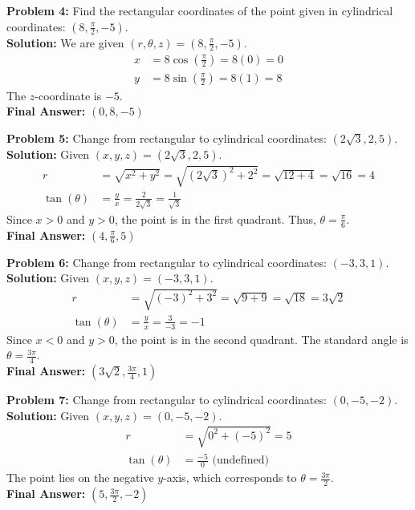 \documentclass[12pt]{article}
\begin{document}
\textbf{Problem 4:} Find the rectangular coordinates of the point given in cylindrical coordinates: $(8, \frac{\pi}{2}, -5)$.
\\
\textbf{Solution:} We are given $(r, \theta, z) = (8, \frac{\pi}{2}, -5)$.
\begin{align*}
x &= 8 \cos\left(\frac{\pi}{2}\right) = 8(0) = 0 \\
y &= 8 \sin\left(\frac{\pi}{2}\right) = 8(1) = 8
\end{align*}
The $z$-coordinate is $-5$.
\\
\textbf{Final Answer:} $(0, 8, -5)$
\vspace{0.5cm}

\textbf{Problem 5:} Change from rectangular to cylindrical coordinates: $(2\sqrt{3}, 2, 5)$.
\\
\textbf{Solution:} Given $(x, y, z) = (2\sqrt{3}, 2, 5)$.
\begin{align*}
r &= \sqrt{x^2 + y^2} = \sqrt{(2\sqrt{3})^2 + 2^2} = \sqrt{12 + 4} = \sqrt{16} = 4 \\
\tan(\theta) &= \frac{y}{x} = \frac{2}{2\sqrt{3}} = \frac{1}{\sqrt{3}}
\end{align*}
Since $x > 0$ and $y > 0$, the point is in the first quadrant. Thus, $\theta = \frac{\pi}{6}$.
\\
\textbf{Final Answer:} $(4, \frac{\pi}{6}, 5)$
\vspace{0.5cm}

\textbf{Problem 6:} Change from rectangular to cylindrical coordinates: $(-3, 3, 1)$.
\\
\textbf{Solution:} Given $(x, y, z) = (-3, 3, 1)$.
\begin{align*}
r &= \sqrt{(-3)^2 + 3^2} = \sqrt{9 + 9} = \sqrt{18} = 3\sqrt{2} \\
\tan(\theta) &= \frac{y}{x} = \frac{3}{-3} = -1
\end{align*}
Since $x < 0$ and $y > 0$, the point is in the second quadrant. The standard angle is $\theta = \frac{3\pi}{4}$.
\\
\textbf{Final Answer:} $(3\sqrt{2}, \frac{3\pi}{4}, 1)$
\vspace{0.5cm}

\textbf{Problem 7:} Change from rectangular to cylindrical coordinates: $(0, -5, -2)$.
\\
\textbf{Solution:} Given $(x, y, z) = (0, -5, -2)$.
\begin{align*}
r &= \sqrt{0^2 + (-5)^2} = 5 \\
\tan(\theta) &= \frac{-5}{0} \text{ (undefined)}
\end{align*}
The point lies on the negative $y$-axis, which corresponds to $\theta = \frac{3\pi}{2}$.
\\
\textbf{Final Answer:} $(5, \frac{3\pi}{2}, -2)$
\vspace{0.5cm}
\end{document}
